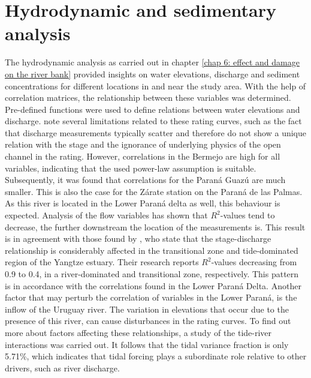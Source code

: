 \section{Hydrodynamic and sedimentary analysis}
The hydrodynamic analysis as carried out in chapter \ref{chap 6: effect and damage on the river bank} provided insights on water elevations, discharge and sediment concentrations for different locations in and near the study area. With the help of correlation matrices, the relationship between these variables was determined. Pre-defined functions were used to define relations between water elevations and discharge. \textcite{schmidtStageDischargeRelationshipOpen2011} note several limitations related to these rating curves, such as the fact that discharge measurements typically scatter and therefore do not show a unique relation with the stage and the ignorance of underlying physics of the open channel in the rating. However, correlations in the Bermejo are high for all variables, indicating that the used power-law assumption is suitable. Subsequently, it was found that correlations for the Paraná Guazú are much smaller. This is also the case for the Zárate station on the Paraná de las Palmas. As this river is located in the Lower Paraná delta as well, this behaviour is expected. Analysis of the flow variables has shown that $R^2$-values tend to decrease, the further downstream the location of the measurements is. This result is in agreement with those found by \textcite{songEvaluatingUnderstandingTideriver2024}, who state that the stage-discharge relationship is considerably affected in the transitional zone and tide-dominated region of the Yangtze estuary. Their research reports $R^2$-values decreasing from 0.9 to 0.4, in a river-dominated and transitional zone, respectively. This pattern is in accordance with the correlations found in the Lower Paraná Delta. Another factor that may perturb the correlation of variables in the Lower Paraná, is the inflow of the Uruguay river. The variation in elevations that occur due to the presence of this river, can cause disturbances in the rating curves. To find out more about factors affecting these relationships, a study of the tide-river interactions was carried out. It follows that the tidal variance fraction is only 5.71\%, which indicates that tidal forcing plays a subordinate role relative to other drivers, such as river discharge. 

